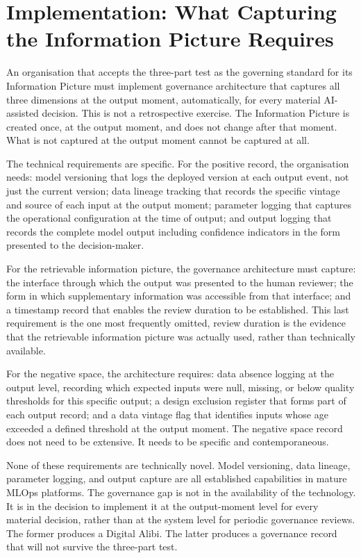 \scenebreak

\section{Implementation: What Capturing the Information Picture Requires}

An organisation that accepts the three-part test as the governing standard for its Information Picture must implement governance architecture that captures all three dimensions at the output moment, automatically, for every material AI-assisted decision. This is not a retrospective exercise. The Information Picture is created once, at the output moment, and does not change after that moment. What is not captured at the output moment cannot be captured at all.

The technical requirements are specific. For the positive record, the organisation needs: model versioning that logs the deployed version at each output event, not just the current version; data lineage tracking that records the specific vintage and source of each input at the output moment; parameter logging that captures the operational configuration at the time of output; and output logging that records the complete model output including confidence indicators in the form presented to the decision-maker.

For the retrievable information picture, the governance architecture must capture: the interface through which the output was presented to the human reviewer; the form in which supplementary information was accessible from that interface; and a timestamp record that enables the review duration to be established. This last requirement is the one most frequently omitted, review duration is the evidence that the retrievable information picture was actually used, rather than technically available.

For the negative space, the architecture requires: data absence logging at the output level, recording which expected inputs were null, missing, or below quality thresholds for this specific output; a design exclusion register that forms part of each output record; and a data vintage flag that identifies inputs whose age exceeded a defined threshold at the output moment. The negative space record does not need to be extensive. It needs to be specific and contemporaneous.

None of these requirements are technically novel. Model versioning, data lineage, parameter logging, and output capture are all established capabilities in mature MLOps platforms. The governance gap is not in the availability of the technology. It is in the decision to implement it at the output-moment level for every material decision, rather than at the system level for periodic governance reviews. The former produces a Digital Alibi. The latter produces a governance record that will not survive the three-part test.

